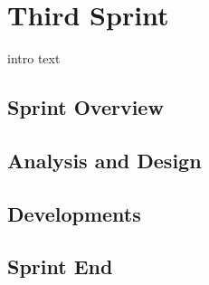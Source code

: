\chapter{Third Sprint}\label{chap:sprint3}
intro text
\section{Sprint Overview}


\section{Analysis and Design}


\section{Developments}


\section{Sprint End}
